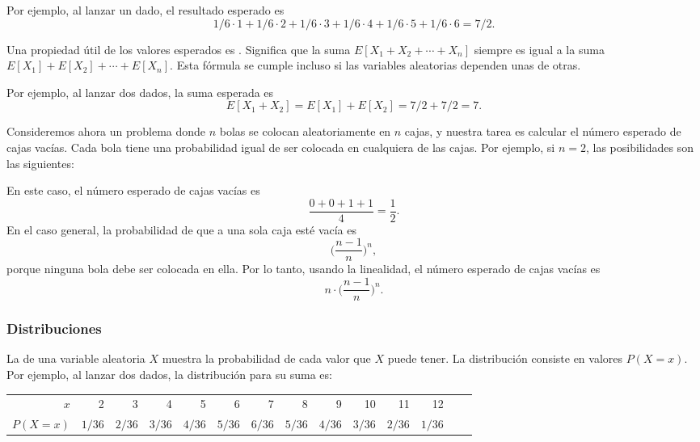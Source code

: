 Por ejemplo, al lanzar un dado,
el resultado esperado es
\[1/6 \cdot 1 + 1/6 \cdot 2 + 1/6 \cdot 3 + 1/6 \cdot 4 + 1/6 \cdot 5 + 1/6 \cdot 6 = 7/2.\]

Una propiedad útil de los valores esperados es .
Significa que la suma
$E[X_1+X_2+\cdots+X_n]$
siempre es igual a la suma
$E[X_1]+E[X_2]+\cdots+E[X_n]$.
Esta fórmula se cumple incluso si las variables aleatorias
dependen unas de otras.

Por ejemplo, al lanzar dos dados,
la suma esperada es
\[E[X_1+X_2]=E[X_1]+E[X_2]=7/2+7/2=7.\]

Consideremos ahora un problema donde
$n$ bolas se colocan aleatoriamente en $n$ cajas,
y nuestra tarea es calcular el número esperado
de cajas vacías.
Cada bola tiene una probabilidad igual de
ser colocada en cualquiera de las cajas.
Por ejemplo, si $n=2$, las posibilidades
son las siguientes:
\begin{center}
\end{center}
En este caso, el número esperado de
cajas vacías es
\[\frac{0+0+1+1}{4} = \frac{1}{2}.\]
En el caso general, la probabilidad de que a
una sola caja esté vacía es
\[\Big(\frac{n-1}{n}\Big)^n,\]
porque ninguna bola debe ser colocada en ella.
Por lo tanto, usando la linealidad, el número esperado de
cajas vacías es
\[n \cdot \Big(\frac{n-1}{n}\Big)^n.\]

\subsubsection{Distribuciones}


La  de una variable aleatoria $X$
muestra la probabilidad de cada valor que
$X$ puede tener.
La distribución consiste en valores $P(X=x)$.
Por ejemplo, al lanzar dos dados,
la distribución para su suma es:
\begin{center}
\small {
\begin{tabular}{r|rrrrrrrrrrrrr}
$x$ & 2 & 3 & 4 & 5 & 6 & 7 & 8 & 9 & 10 & 11 & 12 \\
$P(X=x)$ & $1/36$ & $2/36$ & $3/36$ & $4/36$ & $5/36$ & $6/36$ & $5/36$ & $4/36$ & $3/36$ & $2/36$ & $1/36$ \\
\end{tabular}
}
\end{center}

